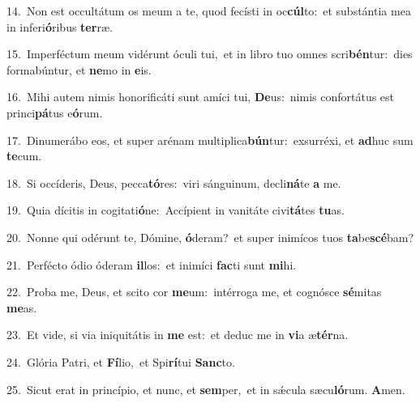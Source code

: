 {\numbfont\textcolor{\numbcolor}{14.}}~Non est occultátum os meum a te, quod fecísti in oc\-\textbf{cúl}\-to:~\star et substántia mea in inferi\-\textbf{ó}\-ribus \textbf{ter}\-ræ.\par
{\numbfont\textcolor{\numbcolor}{15.}}~Imperféctum meum vidérunt óculi tui,~\dagger et in libro tuo omnes scri\-\textbf{bén}\-tur:~\star dies formabúntur, et \textbf{ne}\-mo in \textbf{e}\-is.\par
{\numbfont\textcolor{\numbcolor}{16.}}~Mihi autem nimis honorificáti sunt amíci tui, \textbf{De}\-us:~\star nimis confortátus est princi\-\textbf{pá}\-tus e\-\textbf{ó}\-rum.\par
{\numbfont\textcolor{\numbcolor}{17.}}~Dinumerábo eos, et super arénam multiplica\-\textbf{bún}\-tur:~\star exsurréxi, et \textbf{ad}\-huc sum \textbf{te}\-cum.\par
{\numbfont\textcolor{\numbcolor}{18.}}~Si occíderis, Deus, pecca\-\textbf{tó}\-res:~\star viri sánguinum, decli\-\textbf{ná}\-te \textbf{a} me.\par
{\numbfont\textcolor{\numbcolor}{19.}}~Quia dícitis in cogitati\-\textbf{ó}\-ne:~\star Accípient in vanitáte civi\-\textbf{tá}\-tes \textbf{tu}\-as.\par
{\numbfont\textcolor{\numbcolor}{20.}}~Nonne qui odérunt te, Dómine, \textbf{ó}\-deram?~\star et super inimícos tuos \textbf{ta}\-be\-\textbf{scé}\-bam?\par
{\numbfont\textcolor{\numbcolor}{21.}}~Perfécto ódio óderam \textbf{il}\-los:~\star et inimíci \textbf{fac}\-ti sunt \textbf{mi}\-hi.\par
{\numbfont\textcolor{\numbcolor}{22.}}~Proba me, Deus, et scito cor \textbf{me}\-um:~\star intérroga me, et cognósce \textbf{sé}\-mitas \textbf{me}\-as.\par
{\numbfont\textcolor{\numbcolor}{23.}}~Et vide, si via iniquitátis in \textbf{me} est:~\star et deduc me in \textbf{vi}\-a æ\-\textbf{tér}\-na.\par
{\numbfont\textcolor{\numbcolor}{24.}}~Glória Patri, et \textbf{Fí}\-lio,~\star et Spi\-\textbf{rí}\-tui \textbf{Sanc}\-to.\par
{\numbfont\textcolor{\numbcolor}{25.}}~Sicut erat in princípio, et nunc, et \textbf{sem}\-per,~\star et in sǽcula sæcu\-\textbf{ló}\-rum. \textbf{A}\-men.\par
